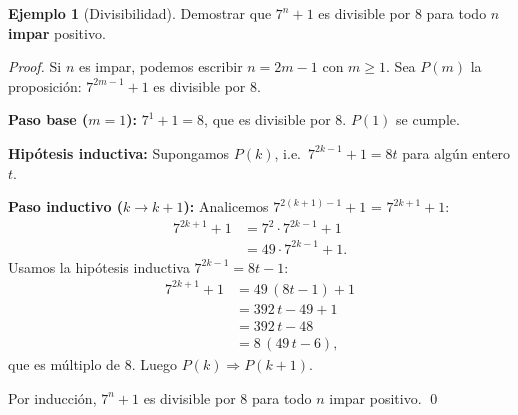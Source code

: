 \documentclass[11pt,a4paper]{article}
\theoremstyle{definition}
\theoremstyle{plain}
\theoremstyle{definition}
\newtheorem{ejemplo}{Ejemplo}[section]
\theoremstyle{definition}
\theoremstyle{remark}
\newcommand{\implica}{\Rightarrow}         %
\begin{document}
\begin{ejemplo}[Divisibilidad]
\label{ej:divisibilidad}
Demostrar que $7^{n} + 1$ es divisible por $8$ para todo $n$ \textbf{impar}
positivo.

\begin{proof}
Si $n$ es impar, podemos escribir $n = 2m-1$ con $m \geq 1$.
Sea $P(m)$ la proposici\'on: $7^{2m-1} + 1$ es divisible por $8$.

\noindent\textbf{Paso base ($m=1$):}
$7^{1} + 1 = 8$, que es divisible por $8$. $P(1)$ se cumple.

\noindent\textbf{Hip\'otesis inductiva:} Supongamos $P(k)$, i.e.\
$7^{2k-1} + 1 = 8t$ para alg\'un entero $t$.

\noindent\textbf{Paso inductivo ($k \to k+1$):} Analicemos $7^{2(k+1)-1} + 1$
= $7^{2k+1} + 1$:
\[
\begin{aligned}
7^{2k+1} + 1 &= 7^{2} \cdot 7^{2k-1} + 1 \\
            &= 49 \cdot 7^{2k-1} + 1.
\end{aligned}
\]
Usamos la hip\'otesis inductiva $7^{2k-1} = 8t - 1$:
\[
\begin{aligned}
7^{2k+1} + 1 &= 49\,(8t - 1) + 1 \\
             &= 392\,t - 49 + 1 \\
             &= 392\,t - 48 \\
             &= 8\,(49\,t - 6),
\end{aligned}
\]
que es m\'ultiplo de $8$. Luego $P(k) \implica P(k+1)$.

\noindent Por inducci\'on, $7^{n}+1$ es divisible por $8$ para todo $n$ impar
positivo.
\qed
\end{proof}
\end{ejemplo}
\end{document}
